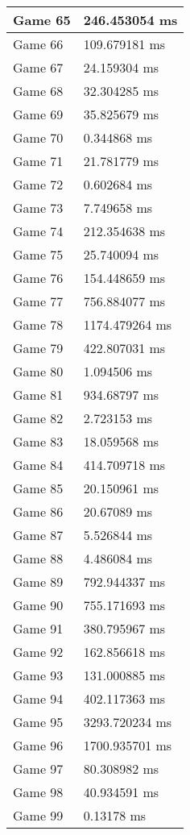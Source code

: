 \begin{multicols}{2}
\begin{tabular}{|l|l|}
	Game 65 & 246.453054 ms \\ \hline
	Game 66 & 109.679181 ms \\ \hline
	Game 67 & 24.159304 ms \\ \hline
	Game 68 & 32.304285 ms \\ \hline
	Game 69 & 35.825679 ms \\ \hline
	Game 70 & 0.344868 ms \\ \hline
	Game 71 & 21.781779 ms \\ \hline
	Game 72 & 0.602684 ms \\ \hline
	Game 73 & 7.749658 ms \\ \hline
	Game 74 & 212.354638 ms \\ \hline
	Game 75 & 25.740094 ms \\ \hline
	Game 76 & 154.448659 ms \\ \hline
	Game 77 & 756.884077 ms \\ \hline
	Game 78 & 1174.479264 ms \\ \hline
	Game 79 & 422.807031 ms \\ \hline
	Game 80 & 1.094506 ms \\ \hline
	Game 81 & 934.68797 ms \\ \hline
	Game 82 & 2.723153 ms \\ \hline
	Game 83 & 18.059568 ms \\ \hline
	Game 84 & 414.709718 ms \\ \hline
	Game 85 & 20.150961 ms \\ \hline
	Game 86 & 20.67089 ms \\ \hline
	Game 87 & 5.526844 ms \\ \hline
	Game 88 & 4.486084 ms \\ \hline
	Game 89 & 792.944337 ms \\ \hline
	Game 90 & 755.171693 ms \\ \hline
	Game 91 & 380.795967 ms \\ \hline
	Game 92 & 162.856618 ms \\ \hline
	Game 93 & 131.000885 ms \\ \hline
	Game 94 & 402.117363 ms \\ \hline
	Game 95 & 3293.720234 ms \\ \hline
	Game 96 & 1700.935701 ms \\ \hline
	Game 97 & 80.308982 ms \\ \hline
	Game 98 & 40.934591 ms \\ \hline
	Game 99 & 0.13178 ms \\ \hline
\end{tabular}\\

\end{multicols}
